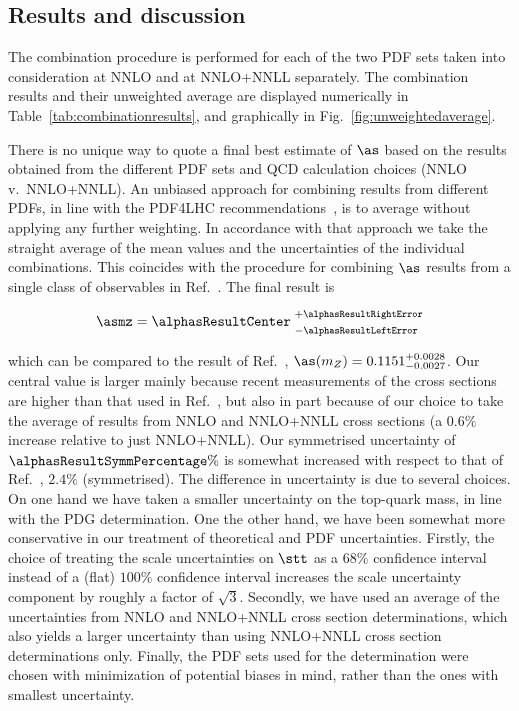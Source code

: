 \subsection{Results and discussion}


The combination procedure is performed for each of the two PDF sets
taken into consideration at NNLO and at NNLO+NNLL separately. The
combination results and their unweighted average are displayed
numerically in Table~\ref{tab:combinationresults}, and graphically in
Fig.~\ref{fig:unweightedaverage}.

There is no unique way to quote a final best estimate of $\as$ based
on the results obtained from the different PDF sets and QCD
calculation choices (NNLO v.\ NNLO+NNLL).
%
An unbiased approach for combining results from different PDFs, in
line with the PDF4LHC recommendations~\cite{Butterworth:2015oua}, is to average
without applying any further weighting.
%
In accordance with that approach we take the straight average of the mean
values and the uncertainties of the individual combinations.
%
This coincides with the procedure for combining $\as$ results from a
single class of observables in Ref.~\cite{pdg}.
%
The final result is
\begin{linenomath*}
\begin{equation}
\asmz =
    \alphasResultCenter
    \; {}^{\highersub{$+\alphasResultRightError${}}}_{\lowersub{$-\alphasResultLeftError${} }}
\end{equation}
\end{linenomath*}
%
which can be compared to the result of Ref.~\cite{Chatrchyan:2013haa},
$\as(m_Z) = 0.1151^{+0.0028}_{-0.0027}$.
%
Our central value is larger mainly because recent measurements of the
cross sections are higher than that used in
Ref.~\cite{Chatrchyan:2013haa}, but also in part because of our choice
to take the average of results from NNLO and NNLO+NNLL cross sections
(a $0.6\%$ increase relative to just NNLO+NNLL).
%
Our symmetrised uncertainty of $\alphasResultSymmPercentage\%$ is
somewhat increased with respect to that of
Ref.~\cite{Chatrchyan:2013haa}, $2.4\%$ (symmetrised).
%
The difference in uncertainty is due to several choices.
%
On one hand we have taken a smaller uncertainty on the top-quark mass,
in line with the PDG determination.
%
One the other hand, we have been somewhat more conservative in our
treatment of theoretical and PDF uncertainties.
%
Firstly, the choice of treating the scale uncertainties on $\stt$ as a
$68\%$ confidence interval instead of a (flat) $100\%$ confidence
interval increases the scale uncertainty component by roughly a factor
of $\sqrt{3}$.
%
Secondly, we have used an average of the uncertainties from NNLO and
NNLO+NNLL cross section determinations, which also yields a larger
uncertainty than using NNLO+NNLL cross section determinations only.
%
Finally, the PDF sets used for the determination were chosen with
minimization of potential biases in mind, rather than the ones with
smallest uncertainty.
%


